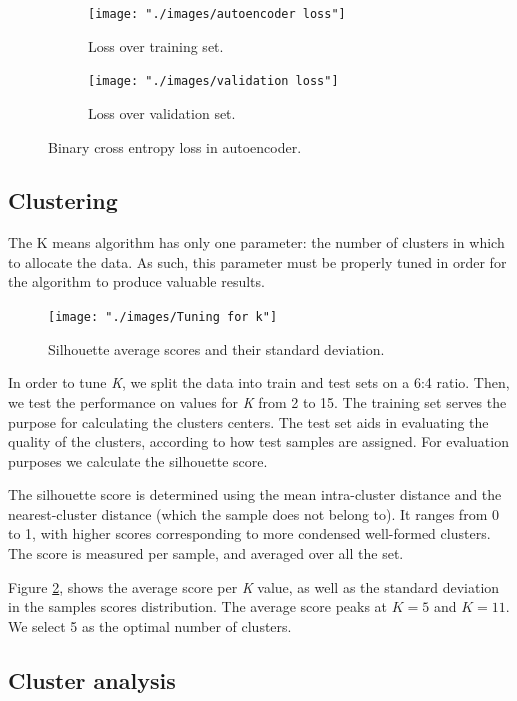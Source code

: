 \documentclass{article}
\begin{document}
\begin{figure}[H]
  \centering
  \begin{subfigure}[b]{.9\textwidth}
  	\centering
	\texttt{[image: "./images/autoencoder loss"]}
  \caption{Loss over training set.}
  \end{subfigure}
  \begin{subfigure}[b]{.9\textwidth}
  	\centering
	\texttt{[image: "./images/validation loss"]}
  \caption{Loss over validation set.}
  \end{subfigure}
  \caption{Binary cross entropy loss in autoencoder.}
  	\label{fig:clustering/loss} 
\end{figure}

\subsection{Clustering}
The K means algorithm has only one parameter: the number of clusters in which to allocate the data. As such, this parameter must be properly tuned in order for the algorithm to produce valuable results. 

\begin{figure}[H]
  \centering
  \texttt{[image: "./images/Tuning for k"]}
  \caption{Silhouette average scores and their standard deviation.}
  \label{fig:clustering/tuning}
\end{figure}

In order to tune \textit{K}, we split the data into train and test sets on a 6:4 ratio. Then, we test the performance on values for \textit{K} from 2 to 15. The training set serves the purpose for calculating the clusters centers. The test set aids in evaluating the quality of the clusters, according to how test samples are assigned. For evaluation purposes we calculate the silhouette score. 

The silhouette score is determined using the mean intra-cluster distance and the nearest-cluster distance (which the sample does not belong to). It ranges from 0 to 1, with higher scores corresponding to more condensed well-formed clusters. The score is measured per sample, and averaged over all the set. 

Figure \ref{fig:clustering/tuning}, shows the average score per \textit{K} value, as well as the standard deviation in the samples scores distribution. The average score peaks at $\textit{K} = 5 $ and $\textit{K} = 11 $. We select 5 as the optimal number of clusters. 

\subsection{Cluster analysis}
\end{document}
